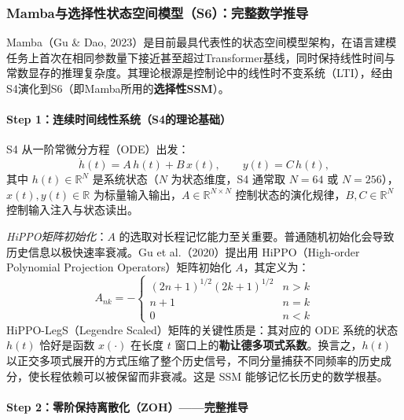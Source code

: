 \documentclass[12pt,a4paper]{article}
\begin{document}
\subsubsection{Mamba与选择性状态空间模型（S6）：完整数学推导}
\label{sec:mamba}

Mamba（Gu \& Dao, 2023）是目前最具代表性的状态空间模型架构，在语言建模任务上首次在相同参数量下接近甚至超过Transformer基线，同时保持线性时间与常数显存的推理复杂度。其理论根源是控制论中的线性时不变系统（LTI），经由S4演化到S6（即Mamba所用的\textbf{选择性SSM}）。

\paragraph{Step 1：连续时间线性系统（S4的理论基础）}

S4 从一阶常微分方程（ODE）出发：
\begin{equation}
\dot{h}(t) = A\, h(t) + B\, x(t),\qquad y(t) = C\, h(t),
\end{equation}
其中 $h(t) \in \mathbb{R}^N$ 是系统状态（$N$ 为状态维度，S4 通常取 $N=64$ 或 $N=256$），$x(t), y(t) \in \mathbb{R}$ 为标量输入输出，$A \in \mathbb{R}^{N\times N}$ 控制状态的演化规律，$B, C \in \mathbb{R}^N$ 控制输入注入与状态读出。

\textit{HiPPO矩阵初始化}：$A$ 的选取对长程记忆能力至关重要。普通随机初始化会导致历史信息以极快速率衰减。Gu et al.（2020）提出用 HiPPO（High-order Polynomial Projection Operators）矩阵初始化 $A$，其定义为：
\begin{equation}
A_{nk} = -\begin{cases}
(2n+1)^{1/2}(2k+1)^{1/2} & n > k\\
n+1 & n = k\\
0 & n < k
\end{cases}
\end{equation}
HiPPO-LegS（Legendre Scaled）矩阵的关键性质是：其对应的 ODE 系统的状态 $h(t)$ 恰好是函数 $x(\cdot)$ 在长度 $t$ 窗口上的\textbf{勒让德多项式系数}。换言之，$h(t)$ 以正交多项式展开的方式压缩了整个历史信号，不同分量捕获不同频率的历史成分，使长程依赖可以被保留而非衰减。这是 SSM 能够记忆长历史的数学根基。

\paragraph{Step 2：零阶保持离散化（ZOH）——完整推导}
\end{document}
